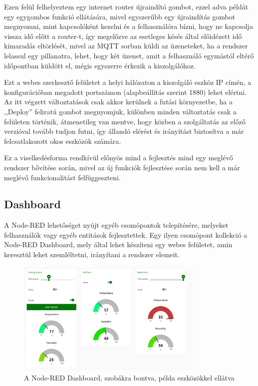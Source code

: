 \documentclass[
]{thesis-ekf}
\theoremstyle{definition}
\theoremstyle{remark}
\begin{document}
Ezen felül felhelyeztem egy internet router újraindító gombot, ezzel adva példát egy egygombos funkció ellátására, mivel egyszerűbb egy újraindítás gombot megnyomni, 
mint kapcsolóként kezelni és a felhasználóra bízni, hogy ne kapcsolja vissza idő előtt a router-t, így megelőzve az esetleges 
késés által előidézett idő kimaradás eltörlését, mivel az MQTT sorban küldi az üzeneteket, ha a rendszer lelassul egy pillanatra, 
lehet, hogy két üzenet, amit a felhasználó egymástól eltérő időpontban küldött el, mégis egyszerre érkezik a kiszolgálóhoz.

Ezt a webes szerkesztő felületet a helyi hálózaton a kiszolgáló eszköz IP címén, a konfigurációban megadott portszámon (alapbeállítás szerint 1880) lehet elértni.
Az itt végzett változtatások csak akkor kerülnek a futási környezetbe, ha a ,,Deploy'' feliratú gombot megnyomjuk, különben minden változtatás
csak a felületen történik, átmenetileg van mentve, hogy közben a szolgáltatás az előző verzióval tovább tudjon futni, így
állandó elérést és irányítást biztosítva a már felcsatlakozott okos eszközök számára.

Ez a viselkedésforma
rendkívül előnyös mind a fejlesztés mind egy meglévő rendszer bővítése során, mivel az új funkciók
fejlesztése során nem kell a már meglévő funkcionalitást felfüggeszteni.

\subsection{Dashboard}
A Node-RED lehetőséget nyújt egyéb csomópontok telepítésére, melyeket felhasználók vagy egyéb entitások fejlesztettek. 
Egy ilyen csomópont kollekció a Node-RED Dashboard\cite{dashboard}, mely által lehet készíteni egy webes felületet, amin keresztül lehet szemléltetni, irányítani a rendszer elemeit. 
\begin{figure}[h]
	\centering
	\includegraphics[width=0.8\textwidth]{images/dashboard.jpg}
	\caption{A Node-RED Dashboard, szobákra bontva, példa eszközökkel ellátva}
\end{figure}
\end{document}
